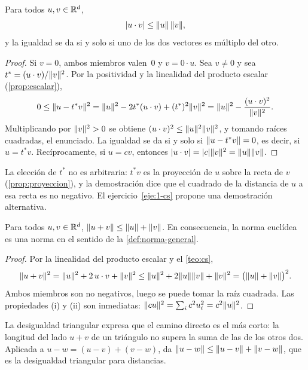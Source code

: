 \begin{teorema}\label{teo:cs}
Para todos $u,v\in\mathbb{R}^{d}$,
\[
\lvert u\cdot v\rvert\le\lVert u\rVert\,\lVert v\rVert,
\]
y la igualdad se da si y solo si uno de los dos vectores es múltiplo del otro.
\end{teorema}

\begin{proof}
Si $v=0$, ambos miembros valen~0 y $v=0\cdot u$. Sea $v\neq 0$ y sea $t^{*}=(u\cdot v)/\lVert v\rVert^{2}$. Por la positividad y la linealidad del producto escalar (\cref{prop:escalar}),
\[
0\le\lVert u-t^{*}v\rVert^{2}=\lVert u\rVert^{2}-2t^{*}(u\cdot v)+(t^{*})^{2}\lVert v\rVert^{2}
=\lVert u\rVert^{2}-\frac{(u\cdot v)^{2}}{\lVert v\rVert^{2}}.
\]
Multiplicando por $\lVert v\rVert^{2}>0$ se obtiene $(u\cdot v)^{2}\le\lVert u\rVert^{2}\lVert v\rVert^{2}$, y tomando raíces cuadradas, el enunciado. La igualdad se da si y solo si $\lVert u-t^{*}v\rVert=0$, es decir, si $u=t^{*}v$. Recíprocamente, si $u=cv$, entonces $\lvert u\cdot v\rvert=\lvert c\rvert\lVert v\rVert^{2}=\lVert u\rVert\lVert v\rVert$.
\end{proof}

La elección de $t^{*}$ no es arbitraria: $t^{*}v$ es la proyección de $u$ sobre la recta de $v$ (\cref{prop:proyeccion}), y la demostración dice que el cuadrado de la distancia de $u$ a esa recta es no negativo. El ejercicio~\ref{eje:1-cs} propone una demostración alternativa.

\begin{corolario}\label{cor:triangular}
Para todos $u,v\in\mathbb{R}^{d}$, $\lVert u+v\rVert\le\lVert u\rVert+\lVert v\rVert$. En consecuencia, la norma euclídea es una norma en el sentido de la \cref{def:norma-general}.
\end{corolario}

\begin{proof}
Por la linealidad del producto escalar y el \cref{teo:cs},
\[
\lVert u+v\rVert^{2}=\lVert u\rVert^{2}+2\,u\cdot v+\lVert v\rVert^{2}\le\lVert u\rVert^{2}+2\lVert u\rVert\lVert v\rVert+\lVert v\rVert^{2}=\bigl(\lVert u\rVert+\lVert v\rVert\bigr)^{2}.
\]
Ambos miembros son no negativos, luego se puede tomar la raíz cuadrada. Las propiedades (i) y (ii) son inmediatas: $\lVert cu\rVert^{2}=\sum_i c^{2}u_i^{2}=c^{2}\lVert u\rVert^{2}$.
\end{proof}

\begin{observacion}
La desigualdad triangular expresa que el camino directo es el más corto: la longitud del lado $u+v$ de un triángulo no supera la suma de las de los otros dos. Aplicada a $u-w=(u-v)+(v-w)$, da $\lVert u-w\rVert\le\lVert u-v\rVert+\lVert v-w\rVert$, que es la desigualdad triangular para distancias.
\end{observacion}


